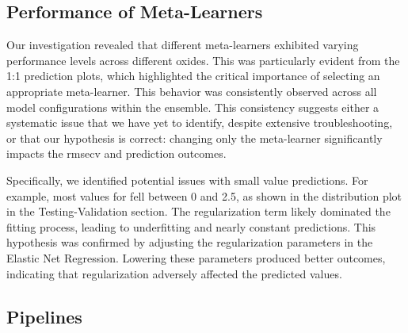 

\subsection{Performance of Meta-Learners}

Our investigation revealed that different meta-learners exhibited varying performance levels across different oxides.
This was particularly evident from the 1:1 prediction plots, which highlighted the critical importance of selecting an appropriate meta-learner.
This behavior was consistently observed across all model configurations within the ensemble.
This consistency suggests either a systematic issue that we have yet to identify, despite extensive troubleshooting, or that our hypothesis is correct: changing only the meta-learner significantly impacts the \gls{rmsecv} and prediction outcomes.

Specifically, we identified potential issues with small value predictions.
For example, most values for  fell between 0 and 2.5, as shown in the distribution plot in the Testing-Validation section.
The regularization term likely dominated the fitting process, leading to underfitting and nearly constant predictions.
This hypothesis was confirmed by adjusting the regularization parameters in the Elastic Net Regression.
Lowering these parameters produced better outcomes, indicating that regularization adversely affected the predicted values.



\subsection{Pipelines}

